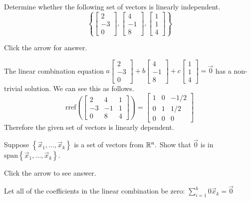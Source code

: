 \documentclass{ximera}
\begin{document}
\begin{problem}\label{prb:solvedCh2_2}
Determine whether the following set of vectors is linearly independent.
$$\left\{\begin{bmatrix}
    2\\ -3\\0
\end{bmatrix}, \begin{bmatrix}
    4\\-1\\8
\end{bmatrix}, \begin{bmatrix}
    1\\1\\4
\end{bmatrix}\right\}$$

Click the arrow for answer.

\begin{expandable}
    The linear combination equation $a\begin{bmatrix}
    2\\ -3\\0
\end{bmatrix}+ b\begin{bmatrix}
    4\\-1\\8
\end{bmatrix}+ c\begin{bmatrix}
    1\\1\\4
\end{bmatrix}=\vec{0}$ has a non-trivial solution.  We can see this as follows.
$$\text{rref}\left(\begin{bmatrix}2 & 4 & 1\\-3 & -1 & 1\\0 & 8 & 4\end{bmatrix}\right)=\begin{bmatrix}
    1 & 0 & -1/2\\0 & 1 &1/2\\ 0 & 0 &0
\end{bmatrix}$$
Therefore the given set of vectors is linearly dependent.
\end{expandable}
\end{problem}

\begin{problem}\label{prb:3.14} Suppose $\left\{ \vec{x}_{1},\ldots ,\vec{x}_{k}\right\} $ is a
set of vectors from $\mathbb{R}^{n}.$ Show that $\vec{0}$ is in $\mbox{
span}\left\{ \vec{x}_{1},\ldots ,\vec{x}_{k}\right\} .$

Click the arrow to see answer.
\begin{expandable}
Let all of the coefficients in the linear combination be zero: 
 $\sum_{i=1}^{k}0\vec{x}_{k}=\vec{0}$
\end{expandable}
\end{problem}
\end{document}
